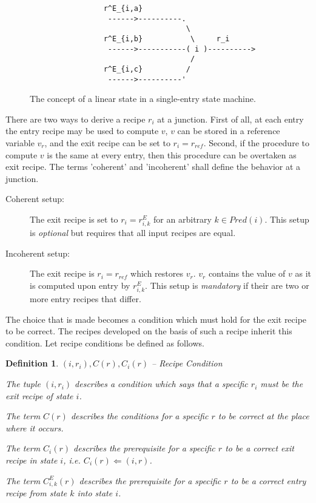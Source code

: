 \documentclass[12pt,a4paper]{scrartcl}
\newtheorem{definition}{Definition}
\begin{document}
\begin{figure}[htbp] \leavevmode \label{fig:junction}
\begin{verbatim}
                 r^E_{i,a}
                  ------>----------.  
                                    \ 
                 r^E_{i,b}           \     r_i
                  ------>-----------( i )----------> 
                                     /          
                 r^E_{i,c}          /
                  ------>----------'
\end{verbatim}
\caption{The concept of a linear state in a single-entry state machine.}
\end{figure}

There are two ways to derive a recipe $r_i$ at a junction.  First of all, at
each entry the entry recipe may be used to compute $v$, $v$ can be stored in a
reference variable $v_r$, and the exit recipe can be set to $r_i=r_{ref}$.
Second, if the procedure to compute $v$ is the same at every entry, then this
procedure can be overtaken as exit recipe. The terms 'coherent' and 'incoherent'
shall define the behavior at a junction. 

\begin{description}

    \item[Coherent setup:] The exit recipe is set to $r_i=r^E_{i,k}$ for
        an arbitrary $k\in Pred(i)$. This setup is \textit{optional} but
        requires that all input recipes are equal.

    \item[Incoherent setup:] The exit recipe is $r_i=r_{ref}$ which restores $v_r$.
        $v_r$ contains the value of $v$ as it is computed upon entry by
        $r^E_{i,k}$.  This setup is \textit{mandatory} if their are two or more
        entry recipes that differ.

\end{description}

The choice that is made becomes a condition which must hold for the exit recipe
to be correct. The recipes developed on the basis of such a recipe inherit this
condition. Let recipe conditions be defined as follows.

\begin{definition} $(i,r_i), C(r), C_i(r)$ -- Recipe Condition

    The tuple $(i, r_i)$ describes a condition which says that a specific $r_i$
    must be the exit recipe of state $i$.      

    The term $C(r)$ describes the conditions for a specific $r$ to be correct
    at the place where it occurs.

    The term $C_i(r)$ describes the prerequisite for a specific $r$ to be a
    correct exit recipe in state $i$, i.e. $C_i(r) \Leftarrow (i, r)$. 

    The term $C^E_{i,k}(r)$ describes the prerequisite for a specific $r$ to be a
    correct entry recipe from state $k$ into state $i$.

\end{definition}
\end{document}
